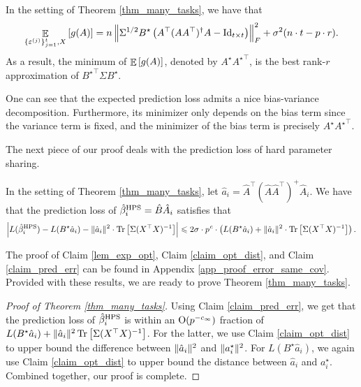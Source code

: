 	\begin{claim}\label{lem_exp_opt}
		In the setting of Theorem \ref{thm_many_tasks}, we have that
		\begin{align}
			\mathop{\mathbb{E}}_{\{\varepsilon^{(j)}\}_{j=1}^t, X}\left[ g(A) \right] = n \left\| \Sigma^{1/2} B^{\star} \left({A^{\top} (AA^{\top})^{\dagger} A - \operatorname{Id}_{t\times t}}\right) \right\|_{F}^2 + \sigma^2 (n\cdot t - p \cdot r). \label{eq_gA}
		\end{align}
		As a result, the minimum of $\mathop{\mathbb{E}}\left[ g(A) \right]$, denoted by $A^{\star}{A^\star}^\top$, is the best rank-$r$ approximation of ${B^{\star}}^{\top}\Sigma B^{\star}$.
	\end{claim}

	 One can see that the expected prediction loss admits a nice bias-variance decomposition.
	Furthermore, its minimizer only depends on the bias term since the variance term is fixed, and the minimizer of the bias term is precisely $A^{\star} {A^{\star}}^{\top}$.

	The next piece of our proof deals with the prediction loss of hard parameter sharing.
	\begin{claim}\label{claim_pred_err}
		In the setting of Theorem \ref{thm_many_tasks},
		let $\hat{a}_i = \hat{A}^{\top} (\hat{A}\hat{A}^{\top})^{+} \hat{A}_i$.
		We have that the prediction loss of $\hat{\beta}_i^{\textup{HPS}} = \hat{B} \hat{A}_i$ satisfies that
		\begin{align*}
			{\left| {L(\hat{\beta}_i^{\textup{HPS}}) - L(B^{\star} \hat{a}_i) - \|\hat{a}_i\|^2 \cdot \operatorname{Tr}\left[\Sigma (X^{\top}X)^{-1}\right]} \right|}
			\leqslant  2\sigma \cdot p^{{\mathit{c}}} \cdot \left({L(B^{\star} \hat{a}_i) + \|\hat{a}_i\|^2 \cdot \operatorname{Tr}\left[\Sigma (X^{\top}X)^{-1}\right]}\right).
		\end{align*}
	\end{claim}
	The proof of Claim \ref{lem_exp_opt}, Claim \ref{claim_opt_dist}, and Claim \ref{claim_pred_err} can be found in Appendix \ref{app_proof_error_same_cov}.
	Provided with these results, we are ready to prove Theorem \ref{thm_many_tasks}.
	\begin{proof}[Proof of Theorem \ref{thm_many_tasks}]
		Using Claim \ref{claim_pred_err}, we get that the prediction loss of $\hat{\beta}_i^{\textup{HPS}}$ is within an $\operatorname{O}(p^{-c_{\infty}})$ fraction of $L(B^{\star}\hat{a}_i)+\|\hat{a}_i\|^2 \operatorname{Tr}\left[\Sigma(X^{\top}X)^{-1}\right]$.
		For the latter, we use Claim \ref{claim_opt_dist} to upper bound the difference between $\|\hat{a}_i\|^2$ and $\|a_i^{\star}\|^2$.
		For $L(B^{\star}\hat{a}_i)$, we again use Claim \ref{claim_opt_dist} to upper bound the distance between $\hat{a}_i$ and $a_i^{\star}$.
		Combined together, our proof is complete.
	\end{proof}
